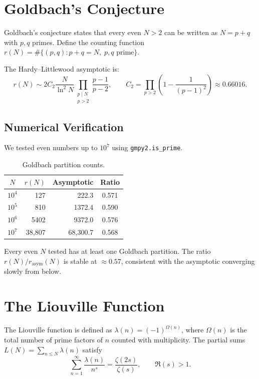 \documentclass[12pt,a4paper]{article}
\theoremstyle{plain}
\begin{document}
\section{Goldbach's Conjecture}
\label{sec:goldbach}

Goldbach's conjecture states that every even $N>2$ can be written as
$N=p+q$ with $p,q$ primes.  Define the counting function
$r(N)=\#\{(p,q): p+q=N,\; p,q\text{ prime}\}$.

The Hardy--Littlewood asymptotic is:
\[
r(N) \sim 2C_2 \frac{N}{\ln^2 N}
\prod_{\substack{p\mid N\\ p>2}} \frac{p-1}{p-2},
\qquad
C_2 = \prod_{p>2}\left(1-\frac1{(p-1)^2}\right)\approx0.66016.
\]

\subsection{Numerical Verification}

We tested even numbers up to $10^7$ using {\tt gmpy2.is\_prime}.

\begin{table}[htbp]
\centering
\caption{Goldbach partition counts.}
\label{tab:goldbach}
\begin{tabular}{crrc}
\hline
$N$ & $r(N)$ & Asymptotic & Ratio \\
\hline
$10^4$ & 127 & 222.3 & 0.571 \\
$10^5$ & 810 & 1372.4 & 0.590 \\
$10^6$ & 5402 & 9372.0 & 0.576 \\
$10^7$ & 38,807 & 68,300.7 & 0.568 \\
\hline
\end{tabular}
\end{table}

Every even $N$ tested has at least one Goldbach partition.
The ratio $r(N)/r_{\text{asym}}(N)$ is stable at $\approx0.57$,
consistent with the asymptotic converging slowly from below.

\section{The Liouville Function}
\label{sec:liouville}

The Liouville function is defined as $\lambda(n)=(-1)^{\Omega(n)}$,
where $\Omega(n)$ is the total number of prime factors of $n$
counted with multiplicity.  The partial sums
$L(N)=\sum_{n\le N}\lambda(n)$ satisfy
\[
\sum_{n=1}^{\infty}\frac{\lambda(n)}{n^{s}} = \frac{\zeta(2s)}{\zeta(s)},\qquad
\Re(s)>1.
\]
\end{document}
